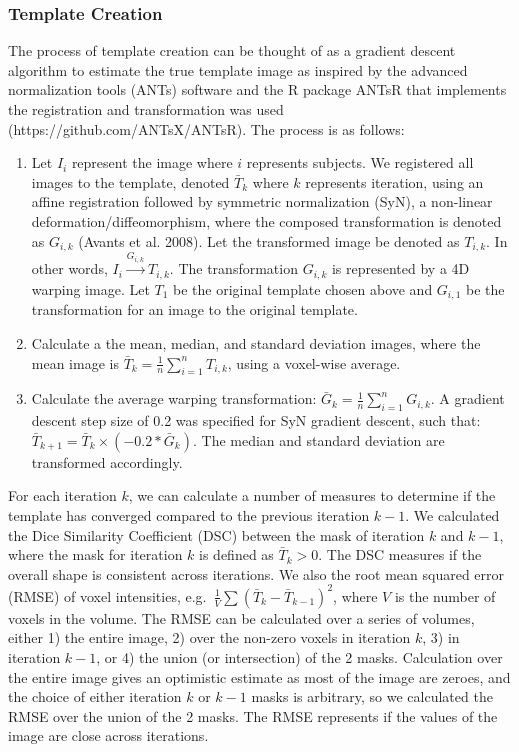 \documentclass[]{elsarticle} %
\providecommand{\tightlist}{%
  \setlength{\itemsep}{0pt}\setlength{\parskip}{0pt}}
\begin{document}
\hypertarget{template-creation}{%
\subsubsection{Template Creation}\label{template-creation}}

The process of template creation can be thought of as a gradient descent algorithm to estimate the true template image as inspired by the advanced normalization tools (ANTs) software and the R package ANTsR that implements the registration and transformation was used (https://github.com/ANTsX/ANTsR). The process is as follows:

\begin{enumerate}
\def\labelenumi{\arabic{enumi}.}
\tightlist
\item
  Let \(I_{i}\) represent the image where \(i\) represents subjects. We registered all images to the template, denoted \(\bar{T}_{k}\) where \(k\) represents iteration, using an affine registration followed by symmetric normalization (SyN), a non-linear deformation/diffeomorphism, where the composed transformation is denoted as \(G_{i, k}\) (Avants et al. 2008). Let the transformed image be denoted as \(T_{i, k}\). In other words, \(I_{i}\overset{G_{i,k}}{\rightarrow}T_{i, k}\). The transformation \(G_{i, k}\) is represented by a 4D warping image. Let \(T_{1}\) be the original template chosen above and \(G_{i, 1}\) be the transformation for an image to the original template.
\item
  Calculate a the mean, median, and standard deviation images, where the mean image is \(\bar{T}_{k} = \frac{1}{n} \sum\limits_{i = 1}^n T_{i, k}\), using a voxel-wise average.\\
\item
  Calculate the average warping transformation: \(\bar{G}_{k} = \frac{1}{n} \sum\limits_{i = 1}^n G_{i, k}\). A gradient descent step size of 0.2 was specified for SyN gradient descent, such that:
  \(\bar{T}_{k + 1} = \bar{T}_{k} \times \left(-0.2 * \bar{G}_{k}\right)\). The median and standard deviation are transformed accordingly.
\end{enumerate}

For each iteration \(k\), we can calculate a number of measures to determine if the template has converged compared to the previous iteration \(k - 1\). We calculated the Dice Similarity Coefficient (DSC) between the mask of iteration \(k\) and \(k-1\), where the mask for iteration \(k\) is defined as \(\bar{T}_{k} > 0\). The DSC measures if the overall shape is consistent across iterations. We also the root mean squared error (RMSE) of voxel intensities, e.g.~\(\frac{1}{V} \sum\left(\bar{T}_{k} - \bar{T}_{k-1}\right)^2\), where \(V\) is the number of voxels in the volume. The RMSE can be calculated over a series of volumes, either 1) the entire image, 2) over the non-zero voxels in iteration \(k\), 3) in iteration \(k-1\), or 4) the union (or intersection) of the 2 masks. Calculation over the entire image gives an optimistic estimate as most of the image are zeroes, and the choice of either iteration \(k\) or \(k-1\) masks is arbitrary, so we calculated the RMSE over the union of the 2 masks. The RMSE represents if the values of the image are close across iterations.
\end{document}
